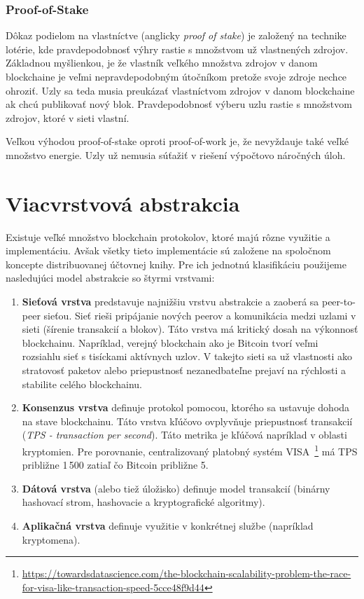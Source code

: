 \subsection{Proof-of-Stake}\label{subsec:pos}

Dôkaz podielom na vlastníctve (anglicky \textit{proof of stake}) je založený na technike lotérie, kde pravdepodobnosť výhry rastie s množstvom už vlastnených zdrojov. Základnou myšlienkou, je že vlastník veľkého množstva zdrojov v danom blockchaine je veľmi nepravdepodobným útočníkom pretože svoje zdroje nechce ohroziť. Uzly sa teda musia preukázať vlastníctvom zdrojov v danom blockchaine ak chcú publikovať nový blok. Pravdepodobnosť výberu uzlu rastie s množstvom zdrojov, ktoré v sieti vlastní.~\cite{homoliakBlockchain, nguyenPos}

Veľkou výhodou proof-of-stake oproti proof-of-work je, že nevyždauje také veľké množstvo energie. Uzly už nemusia súťažiť v riešení výpočtovo náročných úloh. ~\cite{leporeConsensus}

\chapter{Viacvrstvová abstrakcia}

Existuje veľké množstvo blockchain protokolov, ktoré majú rôzne využitie a implementáciu. Avšak všetky tieto implementácie sú založene na spoločnom koncepte distribuovanej účtovnej knihy. Pre ich jednotnú klasifikáciu použijeme nasledujúci model abstrakcie so štyrmi vrstvami:~\cite{homoliakBlockchain}

\begin{enumerate}
	\item \textbf{Sieťová vrstva} predstavuje najnižšiu vrstvu abstrakcie a zaoberá sa peer-to-peer sieťou. Sieť rieši pripájanie nových peerov a komunikácia medzi uzlami v sieti (šírenie transakcií a blokov). Táto vrstva má kritický dosah na výkonnosť blockchainu. Napríklad, verejný blockchain ako je Bitcoin tvorí veľmi rozsiahlu sieť s tisíckami aktívnych uzlov. V takejto sieti sa už vlastnosti ako stratovosť paketov alebo priepustnosť nezanedbateľne prejaví na rýchlosti a stabilite celého blockchainu.~\cite{fanPerfEval}
	\item \textbf{Konsenzus vrstva} definuje protokol pomocou, ktorého sa ustavuje dohoda na stave blockchainu. Táto vrstva kľúčovo ovplyvňuje priepustnosť transakcií (\textit{TPS - transaction per second}). Táto metrika je kľúčová napríklad v oblasti kryptomien. Pre porovnanie, centralizovaný platobný systém VISA~\footnote{\url{https://towardsdatascience.com/the-blockchain-scalability-problem-the-race-for-visa-like-transaction-speed-5cce48f9d44}} má TPS približne 1\,500 zatiaľ čo Bitcoin približne 5.
	\item \textbf{Dátová vrstva} (alebo tiež úložisko) definuje model transakcií (binárny hashovací strom, hashovacie a kryptografické algoritmy).
	\item \textbf{Aplikačná vrstva} definuje využitie v konkrétnej službe (napríklad kryptomena).
\end{enumerate}

